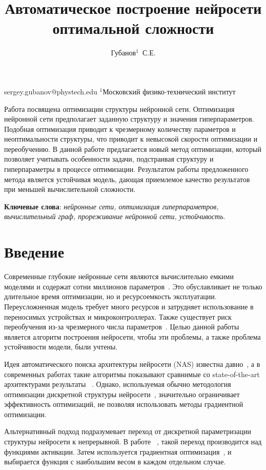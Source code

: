 \documentclass[12pt,twoside]{article}
\begin{document}
\title
    {Автоматическое построение нейросети оптимальной сложности}
\author
    {Губанов$^1$~С.Е.} %
\email
    {sergey.gubanov@phystech.edu}
\organization
    {$^1$Московский физико-технический институт}
\abstract
	{Работа посвящена оптимизации структуры нейронной сети. Оптимизация нейронной сети предполагает заданную структуру и значения гиперпараметров. Подобная оптимизация приводит к чрезмерному количеству параметров и неоптимальности структуры, что приводит к невысокой скорости оптимизации и переобучению. В данной работе предлагается новый метод оптимизации, который позволяет учитывать особенности задачи, подстраивая структуру и гиперпараметры в процессе оптимизации. Результатом работы предложенного метода является устойчивая модель, дающая приемлемое качество результатов при меньшей вычислительной сложности.
		
\bigskip
\textbf{Ключевые слова}: \emph {нейронные сети, оптимизация гиперпараметров, вычислительный граф, прореживание нейронной сети, устойчивость}.

}
\maketitle

\section{Введение}
Современные глубокие нейронные сети являются вычислительно емкими моделями и содержат сотни миллионов параметров~\cite{deepCNN}. Это обуславливает не только длительное время оптимизации, но и ресурсоемкость эксплуатации. Переусложненная модель требует много ресурсов и затрудняет использование в переносимых устройствах и микроконтроллерах. Также существует риск переобучения из-за чрезмерного числа параметров~\cite{overlearning}. Целью данной работы является алгоритм построения нейросети, чтобы эти проблемы, а также проблема устойчивости модели, были учтены. 

Идея автоматического поиска архитектуры нейросети (NAS) известна давно~\cite{NAS1989}, а в современных работах такие алгоритмы показывают сравнимые со state-of-the-art архитектурами результаты ~\cite{zoph2016neural}. Однако, используемая обычно методология оптимизации дискретной структуры нейросети~\cite{deeparchitect}, значительно ограничивает эффективность оптимизаций, не позволяя использовать методы градиентной оптимизации.

Альтернативный подход подразумевает переход от дискретной параметризации структуры нейросети к непрерывной. В работе ~\cite{liu2018darts}, такой переход производится над функциями активации. Затем используется градиентная оптимизация~\cite{gradient}, и выбирается функция с наибольшим весом в каждом отдельном случае.
\end{document}
